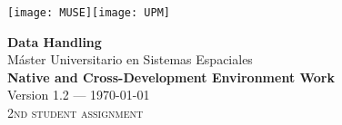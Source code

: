 \begin{titlepage}


\texttt{[image: MUSE]}\hfill \texttt{[image: UPM]}


\vfill\vspace{50pt}

\begin{center}
\textbf{\huge Data Handling}\\[\baselineskip]
{\large Máster Universitario en Sistemas Espaciales}\\[\baselineskip]
\textbf{\Huge Native and Cross-Development Environment Work}\\[\baselineskip]
{\large Version 1.2 --- \today}\\[\baselineskip]
{\large\textsc{2nd student assignment}}
\end{center}

\vfill


\end{titlepage}
